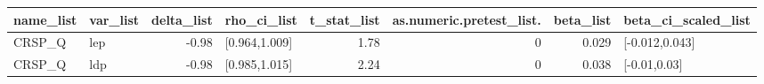 \begin{table}[ht]
\centering
\begin{tabular}{llrlrrrl}
  \hline
name\_list & var\_list & delta\_list & rho\_ci\_list & t\_stat\_list & as.numeric.pretest\_list. & beta\_list & beta\_ci\_scaled\_list \\ 
  \hline
CRSP\_Q & lep & -0.98 & [0.964,1.009] & 1.78 & 0 & 0.029 & [-0.012,0.043] \\ 
  CRSP\_Q & ldp & -0.98 & [0.985,1.015] & 2.24 & 0 & 0.038 & [-0.01,0.03] \\ 
   \hline
\end{tabular}
\end{table}

